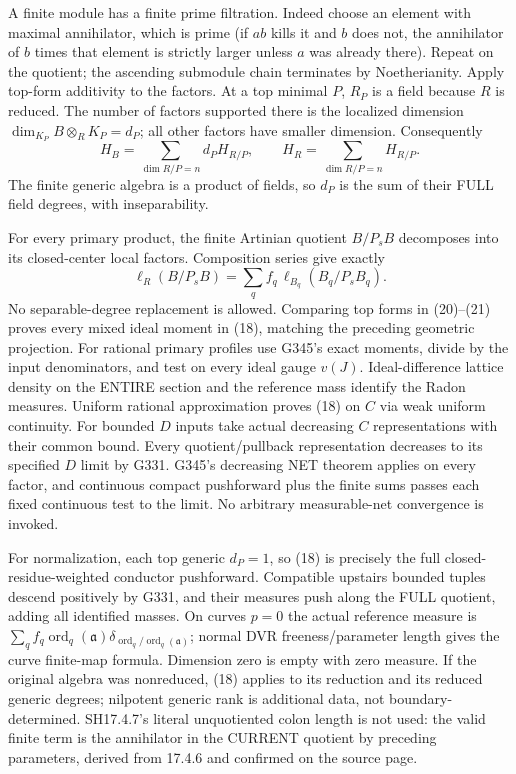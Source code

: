 A finite module has a finite prime filtration. Indeed choose an element with maximal annihilator, which is prime (if $ab$ kills it and $b$ does not, the annihilator of $b$ times that element is strictly larger unless $a$ was already there). Repeat on the quotient; the ascending submodule chain terminates by Noetherianity. Apply top-form additivity to the factors. At a top minimal $P$, $R_P$ is a field because $R$ is reduced. The number of factors supported there is the localized dimension $\dim_{K_P}B\otimes_RK_P=d_P$; all other factors have smaller dimension. Consequently
\[
H_B=\sum_{\dim R/P=n}d_PH_{R/P},\qquad H_R=\sum_{\dim R/P=n}H_{R/P}. \tag{20}
\]
The finite generic algebra is a product of fields, so $d_P$ is the sum of their FULL field degrees, with inseparability.

For every primary product, the finite Artinian quotient $B/P_sB$ decomposes into its closed-center local factors. Composition series give exactly
\[
\ell_R(B/P_sB)=\sum_q f_q\,\ell_{B_q}(B_q/P_sB_q).    \tag{21}
\]
No separable-degree replacement is allowed. Comparing top forms in (20)--(21) proves every mixed ideal moment in (18), matching the preceding geometric projection. For rational primary profiles use G345's exact moments, divide by the input denominators, and test on every ideal gauge $v(J)$. Ideal-difference lattice density on the ENTIRE section and the reference mass identify the Radon measures. Uniform rational approximation proves (18) on $C$ via weak uniform continuity. For bounded $D$ inputs take actual decreasing $C$ representations with their common bound. Every quotient/pullback representation decreases to its specified $D$ limit by G331. G345's decreasing NET theorem applies on every factor, and continuous compact pushforward plus the finite sums passes each fixed continuous test to the limit. No arbitrary measurable-net convergence is invoked.

For normalization, each top generic $d_P=1$, so (18) is precisely the full closed-residue-weighted conductor pushforward. Compatible upstairs bounded tuples descend positively by G331, and their measures push along the FULL quotient, adding all identified masses. On curves $p=0$ the actual reference measure is
$\sum_q f_q\operatorname{ord}_q(\mathfrak a)\delta_{\operatorname{ord}_q/\operatorname{ord}_q(\mathfrak a)}$;
normal DVR freeness/parameter length gives the curve finite-map formula. Dimension zero is empty with zero measure. If the original algebra was nonreduced, (18) applies to its reduction and its reduced generic degrees; nilpotent generic rank is additional data, not boundary-determined. SH17.4.7's literal unquotiented colon length is not used: the valid finite term is the annihilator in the CURRENT quotient by preceding parameters, derived from 17.4.6 and confirmed on the source page.
